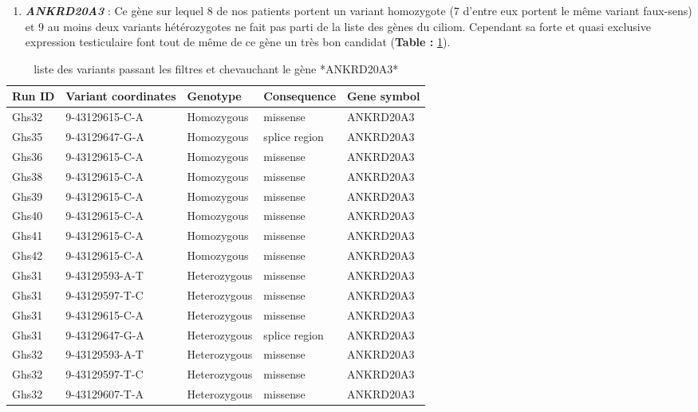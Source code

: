 \documentclass[12pt,twoside]{reedthesis}
\providecommand{\tightlist}{%
  \setlength{\itemsep}{0pt}\setlength{\parskip}{0pt}}
\theoremstyle{definition}
\theoremstyle{definition}
\theoremstyle{remark}
\begin{document}
  \begin{enumerate}
  \def\labelenumi{\arabic{enumi}.}
  \setcounter{enumi}{4}
  \tightlist
  \item
    \textbf{\emph{ANKRD20A3}} : Ce gène sur lequel 8 de nos patients
    portent un variant homozygote (7 d'entre eux portent le même variant
    faux-sens) et 9 au moins deux variants hétérozygotes ne fait pas parti
    de la liste des gènes du ciliom. Cependant sa forte et quasi exclusive
    expression testiculaire font tout de même de ce gène un très bon
    candidat (\textbf{Table : }\ref{tab:tabankrd20a3}).
  \end{enumerate}
  
  \begin{longtable}[t]{lllll}
  \caption{\label{tab:tabankrd20a3}liste des variants passant les filtres et chevauchant le gène *ANKRD20A3*}\\
  \toprule
  Run ID & Variant coordinates & Genotype & Consequence & Gene symbol\\
  \midrule
  Ghs32 & 9-43129615-C-A & Homozygous & missense & ANKRD20A3\\
  Ghs35 & 9-43129647-G-A & Homozygous & splice region & ANKRD20A3\\
  Ghs36 & 9-43129615-C-A & Homozygous & missense & ANKRD20A3\\
  Ghs38 & 9-43129615-C-A & Homozygous & missense & ANKRD20A3\\
  Ghs39 & 9-43129615-C-A & Homozygous & missense & ANKRD20A3\\
  \addlinespace
  Ghs40 & 9-43129615-C-A & Homozygous & missense & ANKRD20A3\\
  Ghs41 & 9-43129615-C-A & Homozygous & missense & ANKRD20A3\\
  Ghs42 & 9-43129615-C-A & Homozygous & missense & ANKRD20A3\\
  Ghs31 & 9-43129593-A-T & Heterozygous & missense & ANKRD20A3\\
  Ghs31 & 9-43129597-T-C & Heterozygous & missense & ANKRD20A3\\
  \addlinespace
  Ghs31 & 9-43129615-C-A & Heterozygous & missense & ANKRD20A3\\
  Ghs31 & 9-43129647-G-A & Heterozygous & splice region & ANKRD20A3\\
  Ghs32 & 9-43129593-A-T & Heterozygous & missense & ANKRD20A3\\
  Ghs32 & 9-43129597-T-C & Heterozygous & missense & ANKRD20A3\\
  Ghs32 & 9-43129607-T-A & Heterozygous & missense & ANKRD20A3\\

\end{longtable}
\end{document}
